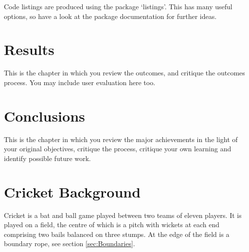 \documentclass[12pt,a4paper]{report}
\begin{document}
Code listings are produced using the package `listings'.  This has many useful options, so have a look at the package documentation for further ideas.

\chapter{Results}

This is the chapter in which you review the outcomes, and critique the outcomes process. You may include user evaluation here too.

\chapter{Conclusions}


This is the chapter in which you review the major achievements in the light of your original objectives, critique the process, critique your own learning and identify possible future work.



\appendix


\chapter{Cricket Background}

Cricket is a bat and ball game played between two teams of eleven players. 
It is played on a field, the centre of which is a pitch with wickets at each end comprising two bails balanced on three stumps. At the edge of the field is a boundary rope, see section \ref{sec:Boundaries}.
\end{document}
